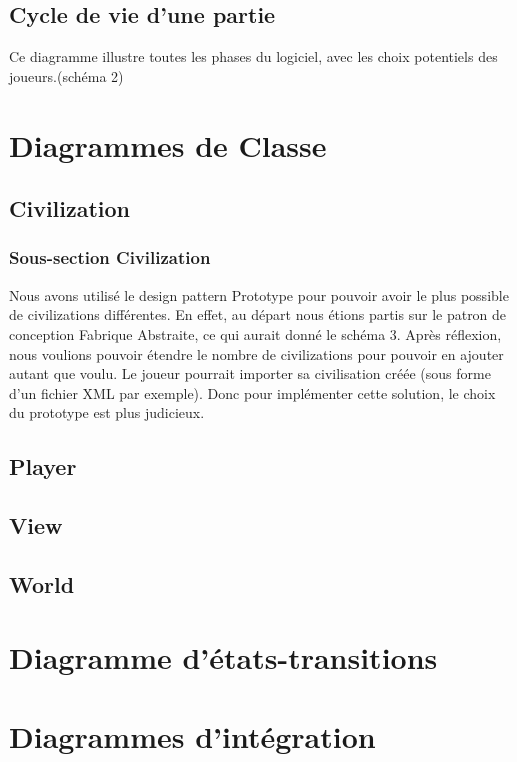 	\subsection{Cycle de vie d'une partie}
	Ce diagramme illustre toutes les phases du logiciel, avec les choix potentiels des joueurs.(schéma 2)
	
\section{Diagrammes de Classe}
	\subsection{Civilization}
		\subsubsection{Sous-section Civilization}
			Nous avons utilisé le design pattern Prototype pour pouvoir avoir le plus possible de civilizations différentes.
		En effet, au départ nous étions partis sur le patron de conception Fabrique Abstraite, ce qui aurait donné le schéma 3.
			Après réflexion, nous voulions pouvoir étendre le nombre de civilizations pour pouvoir en ajouter autant que voulu.
		Le joueur pourrait importer sa civilisation créée (sous forme d'un fichier XML par exemple). 
		Donc pour implémenter cette solution, le choix du prototype est plus judicieux.
	\subsection{Player}
	\subsection{View}
	\subsection{World}
	
	
\section{Diagramme d'états-transitions}

\section{Diagrammes d'intégration}








































